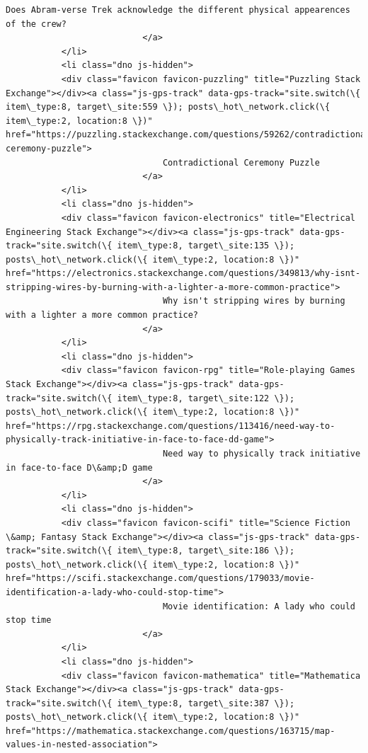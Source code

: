 \documentclass[11pt]{article}
\begin{document}
\begin{Verbatim}[commandchars=\\\{\}]
                               Does Abram-verse Trek acknowledge the different physical appearences of the crew?
                           </a>
           </li>
           <li class="dno js-hidden">
           <div class="favicon favicon-puzzling" title="Puzzling Stack Exchange"></div><a class="js-gps-track" data-gps-track="site.switch(\{ item\_type:8, target\_site:559 \}); posts\_hot\_network.click(\{ item\_type:2, location:8 \})" href="https://puzzling.stackexchange.com/questions/59262/contradictional-ceremony-puzzle">
                               Contradictional Ceremony Puzzle
                           </a>
           </li>
           <li class="dno js-hidden">
           <div class="favicon favicon-electronics" title="Electrical Engineering Stack Exchange"></div><a class="js-gps-track" data-gps-track="site.switch(\{ item\_type:8, target\_site:135 \}); posts\_hot\_network.click(\{ item\_type:2, location:8 \})" href="https://electronics.stackexchange.com/questions/349813/why-isnt-stripping-wires-by-burning-with-a-lighter-a-more-common-practice">
                               Why isn't stripping wires by burning with a lighter a more common practice?
                           </a>
           </li>
           <li class="dno js-hidden">
           <div class="favicon favicon-rpg" title="Role-playing Games Stack Exchange"></div><a class="js-gps-track" data-gps-track="site.switch(\{ item\_type:8, target\_site:122 \}); posts\_hot\_network.click(\{ item\_type:2, location:8 \})" href="https://rpg.stackexchange.com/questions/113416/need-way-to-physically-track-initiative-in-face-to-face-dd-game">
                               Need way to physically track initiative in face-to-face D\&amp;D game
                           </a>
           </li>
           <li class="dno js-hidden">
           <div class="favicon favicon-scifi" title="Science Fiction \&amp; Fantasy Stack Exchange"></div><a class="js-gps-track" data-gps-track="site.switch(\{ item\_type:8, target\_site:186 \}); posts\_hot\_network.click(\{ item\_type:2, location:8 \})" href="https://scifi.stackexchange.com/questions/179033/movie-identification-a-lady-who-could-stop-time">
                               Movie identification: A lady who could stop time
                           </a>
           </li>
           <li class="dno js-hidden">
           <div class="favicon favicon-mathematica" title="Mathematica Stack Exchange"></div><a class="js-gps-track" data-gps-track="site.switch(\{ item\_type:8, target\_site:387 \}); posts\_hot\_network.click(\{ item\_type:2, location:8 \})" href="https://mathematica.stackexchange.com/questions/163715/map-values-in-nested-association">

\end{Verbatim}
\end{document}
